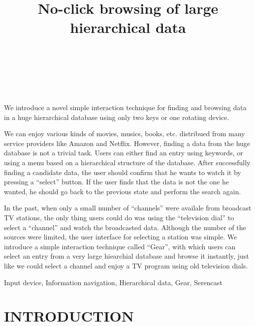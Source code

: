 \documentclass{article}
\begin{document}
\title{No-click browsing of large hierarchical data}
\author{
\begin{tabular}{l}
\parbox{5.5cm}{
\begin{center}
~ \\
~ \\
~
\end{center}
}
\end{tabular}
}
\maketitle
\abstract

We introduce a novel simple interaction technique for finding and browsing
data in a huge hierarchical database using only two keys or
one rotating device.

We can enjoy various kinds of movies, musics, books,
etc. distribued from many service providers like Amazon and Netflix.
However, 
finding a data from the huge database is not a trivial task. Users can
either find an entry using keywords, or using a menu based
on a hierarchical structure of the database.
After successfully finding a candidate data,
the user should confirm that he wants to watch it by pressing a ``select'' button.
If the user finds that the data is not the one he wanted,
he should go back to the previous state and perform the search again.

In the past, when only a small number of ``channels'' were availale
from broadcast TV stations, the only thing users could do was
using the ``television dial'' to select a ``channel'' and watch the
broadcasted data.
Although the number of the sources were limited,
the user interface for selecting a station was simple.
%
We introduce a simple interaction technique called ``Gear'',
with which users can select an entry from a very large hiearchial database and
browse it instantly, just like we could select a channel and enjoy a TV program
using old television dials.

\keywords Input device, Information navigation, Hierarchical data, Gear, Serencast


\section*{INTRODUCTION}
\end{document}
